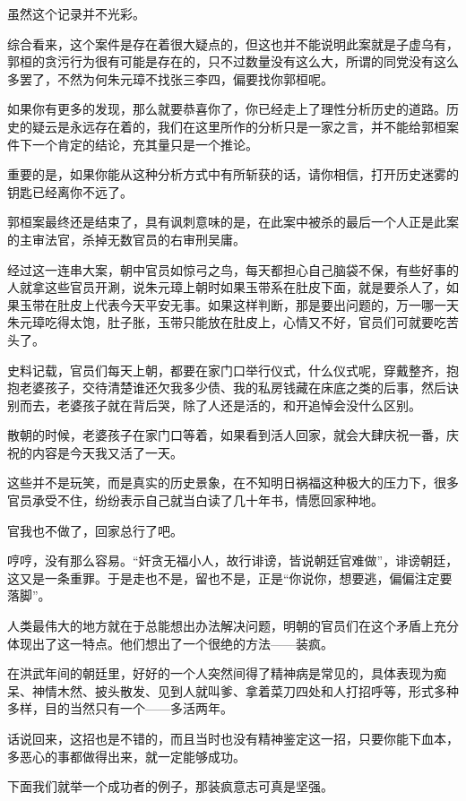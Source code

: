\begin{multicols}{\theparacolNo}
		虽然这个记录并不光彩。

		综合看来，这个案件是存在着很大疑点的，但这也并不能说明此案就是子虚乌有，郭桓的贪污行为很有可能是存在的，只不过数量没有这么大，所谓的同党没有这么多罢了，不然为何朱元璋不找张三李四，偏要找你郭桓呢。

		如果你有更多的发现，那么就要恭喜你了，你已经走上了理性分析历史的道路。历史的疑云是永远存在着的，我们在这里所作的分析只是一家之言，并不能给郭桓案件下一个肯定的结论，充其量只是一个推论。

		重要的是，如果你能从这种分析方式中有所斩获的话，请你相信，打开历史迷雾的钥匙已经离你不远了。

		郭桓案最终还是结束了，具有讽刺意味的是，在此案中被杀的最后一个人正是此案的主审法官，杀掉无数官员的右审刑吴庸。

		经过这一连串大案，朝中官员如惊弓之鸟，每天都担心自己脑袋不保，有些好事的人就拿这些官员开涮，说朱元璋上朝时如果玉带系在肚皮下面，就是要杀人了，如果玉带在肚皮上代表今天平安无事。如果这样判断，那是要出问题的，万一哪一天朱元璋吃得太饱，肚子胀，玉带只能放在肚皮上，心情又不好，官员们可就要吃苦头了。

		史料记载，官员们每天上朝，都要在家门口举行仪式，什么仪式呢，穿戴整齐，抱抱老婆孩子，交待清楚谁还欠我多少债、我的私房钱藏在床底之类的后事，然后诀别而去，老婆孩子就在背后哭，除了人还是活的，和开追悼会没什么区别。

		散朝的时候，老婆孩子在家门口等着，如果看到活人回家，就会大肆庆祝一番，庆祝的内容是今天我又活了一天。

		这些并不是玩笑，而是真实的历史景象，在不知明日祸福这种极大的压力下，很多官员承受不住，纷纷表示自己就当白读了几十年书，情愿回家种地。

		官我也不做了，回家总行了吧。

		哼哼，没有那么容易。“奸贪无福小人，故行诽谤，皆说朝廷官难做”，诽谤朝廷，这又是一条重罪。于是走也不是，留也不是，正是“你说你，想要逃，偏偏注定要落脚”。

		人类最伟大的地方就在于总能想出办法解决问题，明朝的官员们在这个矛盾上充分体现出了这一特点。他们想出了一个很绝的方法——装疯。

		在洪武年间的朝廷里，好好的一个人突然间得了精神病是常见的，具体表现为痴呆、神情木然、披头散发、见到人就叫爹、拿着菜刀四处和人打招呼等，形式多种多样，目的当然只有一个——多活两年。

		话说回来，这招也是不错的，而且当时也没有精神鉴定这一招，只要你能下血本，多恶心的事都做得出来，就一定能够成功。

		下面我们就举一个成功者的例子，那装疯意志可真是坚强。


\end{multicols}
